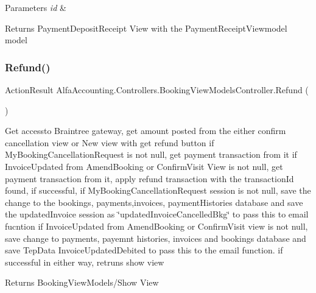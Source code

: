 \begin{DoxyParams}{Parameters}
{\em id} & \\
\hline
\end{DoxyParams}
\begin{DoxyReturn}{Returns}
Payment\+Deposit\+Receipt View with the Payment\+Receipt\+Viewmodel model
\end{DoxyReturn}
\mbox{\label{class_alfa_accounting_1_1_controllers_1_1_booking_view_models_controller_abe04eeac8c2f30835c9661edad9d76a6}} 
\subsubsection{\texorpdfstring{Refund()}{Refund()}}
{\footnotesize\ttfamily Action\+Result Alfa\+Accounting.\+Controllers.\+Booking\+View\+Models\+Controller.\+Refund (\begin{DoxyParamCaption}{ }\end{DoxyParamCaption})}



Get accessto Braintree gateway, get amount posted from the either confirm cancellation view or New view with get refund button if My\+Booking\+Cancellation\+Request is not null, get payment transaction from it if Invoice\+Updated from Amend\+Booking or Confirm\+Visit View is not null, get payment transaction from it, apply refund transaction with the transaction\+Id found, if successful, if My\+Booking\+Cancellation\+Request session is not null, save the change to the bookings, payments,invoices, payment\+Histories database and save the updated\+Invoice session as \char`\"{}updated\+Invoice\+Cancelled\+Bkg\char`\"{} to pass this to email fucntion if Invoice\+Updated from Amend\+Booking or Confirm\+Visit view is not null, save change to payments, payemnt histories, invoices and bookings database and save Tep\+Data Invoice\+Updated\+Debited to pass this to the email function. if successful in either way, retruns show view 

\begin{DoxyReturn}{Returns}
Booking\+View\+Models/\+Show View
\end{DoxyReturn}
\mbox{\label{class_alfa_accounting_1_1_controllers_1_1_booking_view_models_controller_a560b40cc15d83dc780c485d678e3e68c}} 
